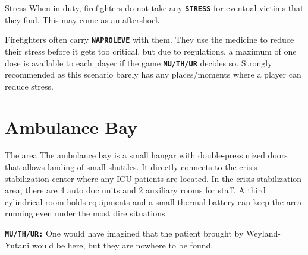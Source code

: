\begin{rpg-commentbox}{Stress}
    When in duty, firefighters do not take any \texttt{\textbf{STRESS}} for eventual victims that they find. This may come as an aftershock.

    Firefighters often carry \texttt{\textbf{NAPROLEVE}} with them. They use the medicine to reduce their stress before it gets too critical, but due to regulations, a maximum of one dose is available to each player if the game \texttt{\textbf{MU/TH/UR}} decides so. Strongly recommended as this scenario barely has any places/moments where a player can reduce stress. 
\end{rpg-commentbox}   





\section{Ambulance Bay}

\begin{rpg-commentbox}{The area}
    The ambulance bay is a small hangar with double-pressurized doors that allows landing of small shuttles. 
    It directly connects to the crisis stabilization center where any ICU patients are located. In the crisis stabilization area, there are 4 auto doc units and 2 auxiliary rooms for staff. A third 
    cylindrical room holds equipments and a small thermal battery can keep the area running even under the most dire situations.
    
    \texttt{\textbf{MU/TH/UR:}} One would have imagined that the patient brought by Weyland-Yutani would be here, but they are nowhere to be found.
\end{rpg-commentbox}  




